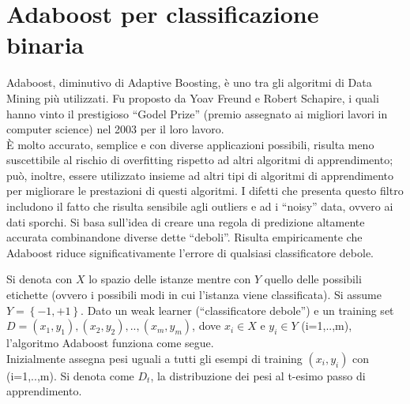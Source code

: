 \chapter{Adaboost per classificazione binaria}
\vspace{1cm}
Adaboost, diminutivo di Adaptive Boosting, \`e uno tra gli algoritmi di Data Mining pi\`u utilizzati. 
Fu proposto da Yoav Freund e Robert Schapire, i quali hanno vinto il prestigioso ``Godel Prize'' (premio assegnato ai migliori lavori in
computer science) nel 2003 per il loro lavoro.\\
\`E molto accurato, semplice e con diverse applicazioni possibili, risulta meno suscettibile al rischio di overfitting rispetto ad altri 
algoritmi di apprendimento; pu\`o, inoltre, essere utilizzato insieme ad altri tipi di algoritmi di apprendimento per migliorare le prestazioni di questi algoritmi.
I difetti che presenta questo filtro includono il fatto che risulta sensibile agli outliers e ad i ``noisy'' data, ovvero ai dati sporchi.
Si basa sull'idea di creare una regola di predizione altamente accurata combinandone diverse dette ``deboli''. Risulta empiricamente che Adaboost riduce significativamente
l'errore di qualsiasi classificatore debole.\\
\newline

Si denota con {\begin{math}X\end{math}} lo spazio delle istanze mentre 
con {\begin{math}Y \end{math}} quello delle possibili etichette (ovvero i possibili modi in cui l'istanza viene classificata).
Si assume \begin{math}Y =\left\{-1,+1\right\}\end{math}. Dato un weak learner (``classificatore debole'') e un training set {\begin{math}D = (x_1,y_1),(x_2,y_2),..,(x_m,y_m)\end{math}}, 
dove {\begin{math} x_i \in X \end{math}} e {\begin{math} y_i \in Y \end{math}} (i=1,..,m), l'algoritmo Adaboost funziona come segue.\\
\newline
Inizialmente assegna pesi uguali a tutti gli esempi di training {\begin{math} (x_i,y_i)\end{math}} con (i=1,..,m).
Si denota come {\begin{math} D_t \end{math}}, la distribuzione dei pesi al t-esimo passo di apprendimento.

